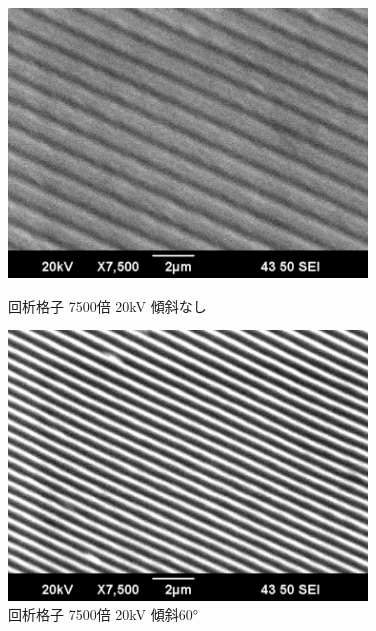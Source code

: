 \documentclass[a4paper,11pt]{jsarticle}
\begin{document}
\begin{figure}[H]
  \begin{minipage}{0.5\hsize}
    \begin{center}
      \includegraphics[width=0.85\textwidth]{figs/0523/kaisetukousi/7500_20kV.pdf}
    \end{center}
    \caption{回析格子 7500倍 20kV 傾斜なし}
  \end{minipage}
  \begin{minipage}{0.5\hsize}
    \begin{center}
      \includegraphics[width=0.85\textwidth]{figs/0523/kaisetukousi/7500_20kV_60.pdf}
    \end{center}
    \caption{回析格子 7500倍 20kV 傾斜60°}
  \end{minipage}
\end{figure}
\end{document}
